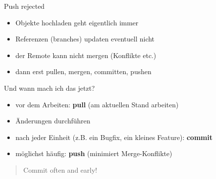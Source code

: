 \begin{frame}{Push rejected}
    \begin{itemize}
        \item Objekte hochladen geht eigentlich immer
        \item Referenzen (branches) updaten eventuell nicht \pause
        \item der Remote kann nicht mergen (Konflikte etc.)
        \item dann erst pullen, mergen, committen, pushen
    \end{itemize}
\end{frame}

\begin{frame}{Und wann mach ich das jetzt?}
    \pause

    \begin{itemize}
        \item vor dem Arbeiten: \textbf{pull} (am aktuellen Stand arbeiten)
        \item Änderungen durchführen
        \item nach jeder Einheit (z.B. ein Bugfix, ein kleines Feature): \textbf{commit}
        \item möglichst häufig: \textbf{push} (minimiert Merge-Konflikte)
    \end{itemize}

    \pause

    \vspace{1cm}

    \begin{quote}
        Commit often and early!
    \end{quote}
\end{frame}
